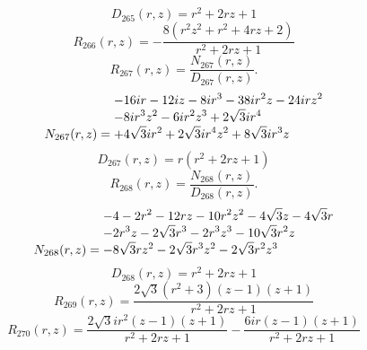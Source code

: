 \documentclass[11pt,a4paper]{article}
\begin{document}
\begin{equation}
D_{265}(r,z)=r^{2} + 2 r z + 1
\label{eq:cat-denominator-265}
\end{equation}
\begin{equation}
R_{266}(r,z)=- \frac{8 \left(r^{2} z^{2} + r^{2} + 4 r z + 2\right)}{r^{2} + 2 r z + 1}
\label{eq:cat-rational-266}
\end{equation}
\begin{equation}
R_{267}(r,z)=\frac{N_{267}(r,z)}{D_{267}(r,z)}.
\label{eq:cat-rational-267}
\end{equation}
\begin{equation}
N_{267}(r,z)=\shortstack[l]{$\displaystyle  - 16 i r - 12 i z - 8 i r^{3} - 38 i r^{2} z - 24 i r z^{2}$\\
$\displaystyle  - 8 i r^{3} z^{2} - 6 i r^{2} z^{3} + 2 \sqrt{3} i r^{4}$\\
$\displaystyle  + 4 \sqrt{3} i r^{2} + 2 \sqrt{3} i r^{4} z^{2} + 8 \sqrt{3} i r^{3} z$}
\label{eq:cat-numerator-267}
\end{equation}
\begin{equation}
D_{267}(r,z)=r \left(r^{2} + 2 r z + 1\right)
\label{eq:cat-denominator-267}
\end{equation}
\begin{equation}
R_{268}(r,z)=\frac{N_{268}(r,z)}{D_{268}(r,z)}.
\label{eq:cat-rational-268}
\end{equation}
\begin{equation}
N_{268}(r,z)=\shortstack[l]{$\displaystyle  - 4 - 2 r^{2} - 12 r z - 10 r^{2} z^{2} - 4 \sqrt{3} z - 4 \sqrt{3} r$\\
$\displaystyle  - 2 r^{3} z - 2 \sqrt{3} r^{3} - 2 r^{3} z^{3} - 10 \sqrt{3} r^{2} z$\\
$\displaystyle  - 8 \sqrt{3} r z^{2} - 2 \sqrt{3} r^{3} z^{2} - 2 \sqrt{3} r^{2} z^{3}$}
\label{eq:cat-numerator-268}
\end{equation}
\begin{equation}
D_{268}(r,z)=r^{2} + 2 r z + 1
\label{eq:cat-denominator-268}
\end{equation}
\begin{equation}
R_{269}(r,z)=\frac{2 \sqrt{3} \left(r^{2} + 3\right) \left(z - 1\right) \left(z + 1\right)}{r^{2} + 2 r z + 1}
\label{eq:cat-rational-269}
\end{equation}
\begin{equation}
R_{270}(r,z)=\frac{2 \sqrt{3} i r^{2} \left(z - 1\right) \left(z + 1\right)}{r^{2} + 2 r z + 1} - \frac{6 i r \left(z - 1\right) \left(z + 1\right)}{r^{2} + 2 r z + 1}
\label{eq:cat-rational-270}
\end{equation}
\end{document}
